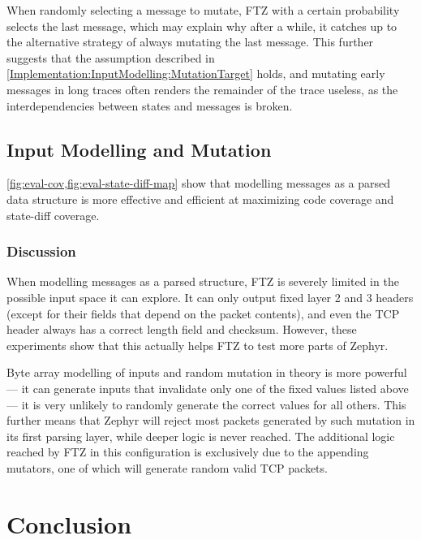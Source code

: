 \documentclass[twocolumn]{article}
\newcommand{\proj}{FTZ\xspace}
\begin{document}
When randomly selecting a message to mutate, \proj with a certain probability selects the last message, which may explain why after a while, it catches up to the alternative strategy of always mutating the last message. This further suggests that the assumption described in \cref{Implementation:InputModelling:MutationTarget} holds, and mutating early messages in long traces often renders the remainder of the trace useless, as the interdependencies between states and messages is broken.

\subsection{Input Modelling and Mutation}

\cref{fig:eval-cov,fig:eval-state-diff-map} show that modelling messages as a parsed data structure is more effective and efficient at maximizing code coverage and state-diff coverage.

\subsubsection*{Discussion}

When modelling messages as a parsed structure, \proj is severely limited in the possible input space it can explore. It can only output fixed layer 2 and 3 headers (except for their fields that depend on the packet contents), and even the TCP header always has a correct length field and checksum. However, these experiments show that this actually helps \proj to test more parts of Zephyr.

Byte array modelling of inputs and random mutation in theory is more powerful — it can generate inputs that invalidate only one of the fixed values listed above — it is very unlikely to randomly generate the correct values for all others. This further means that Zephyr will reject most packets generated by such mutation in its first parsing layer, while deeper logic is never reached. The additional logic reached by \proj in this configuration is exclusively due to the appending mutators, one of which will generate random valid TCP packets.


\section{Conclusion}
\label{Conclusion}
\end{document}
